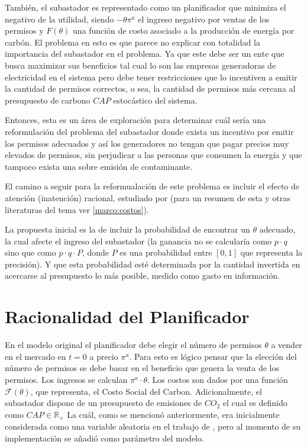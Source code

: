 También, el subastador es representado como un planificador que minimiza el negativo de la utilidad, siendo $-\theta \pi^a$ el ingreso negativo por ventas de los permisos y $F(\theta)$ una función de costo asociado a la producción de energía por carbón. El problema en esto es que parece no explicar con totalidad la importancia del subastador en el problema. Ya que este debe ser un ente que busca maximizar sus beneficios tal cual  lo son las empresas generadoras de electricidad en el sistema pero debe tener restricciones que lo incentiven a emitir la cantidad de permisos correctos, o sea, la cantidad de permisos más cercana al presupuesto de carbono $CAP$ estocástico del sistema.
\vspace{2.5mm}

Entonces, esta es un área de exploración para determinar cuál sería una reformulación del problema del subastador donde exista un incentivo por emitir los permisos adecuados y así los generadores no tengan que pagar precios muy elevados de permisos, sin perjudicar a las personas que consumen la energía y que tampoco exista una sobre emisión de contaminante.
\vspace{2.5mm}

El camino a seguir para la reformualación de este problema es incluir el efecto de atención (inatención) racional, estudiado por  (para un resumen de esta y otras literaturas del tema ver \ref{marco:costos}).
\vspace{2.5mm}

La propuesta inicial es la de incluir la probabilidad de encontrar un $\theta$ adecuado, la cual afecte el ingreso del subastador (la ganancia no se calcularía como $p\cdot q$ sino que como $p\cdot q\cdot P$, donde $P$ es una probabilidad entre $[0,1]$ que representa la precisión). Y que esta probabilidad esté determinada por la cantidad invertida en acercarse al presupuesto lo más posible, medido como gasto en información.

\section{Racionalidad del Planificador}

En el modelo original el planificador debe elegir el número de permisos $\theta$ a vender en el mercado en $t=0$ a precio $\pi^a$. Para esto es lógico pensar que la elección del número de permisos se debe basar en el beneficio que genera la venta de los permisos. Los ingresos se calculan $\pi^a\cdot\theta$. Los costos son dados por una función $\mathcal{F}(\theta)$, que representa, el Costo Social del Carbon. Adicionalmente, el subastador dispone de un presupuesto de emisiones de $CO_2$ el cual es definido como $CAP\in\mathbb{R}_+$ La cuál, como se mencionó anteriormente, era inicialmente considerada como una variable aleatoria en el trabajo de , pero al momento de su implementación se añadió como parámetro del modelo. 
\vspace{2.5mm}

